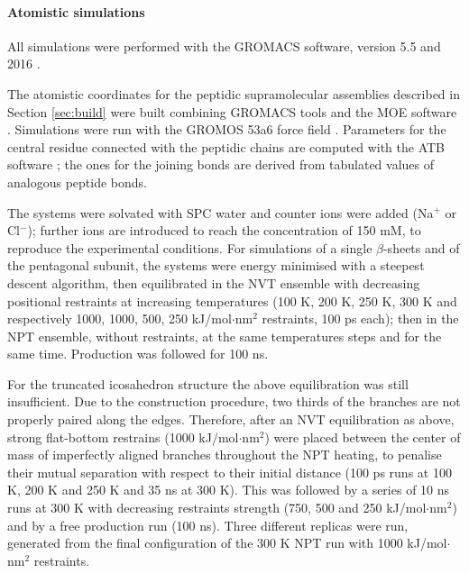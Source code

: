 \paragraph{Atomistic simulations}
All simulations were performed with the GROMACS software, version 5.5 and 2016 \cite{Berendsen1995,Abraham2015,gromacs_man}. 

The atomistic coordinates for the peptidic supramolecular assemblies described in Section \ref{sec:build} were built combining GROMACS tools and the MOE software \cite{moe}.
%
Simulations were run with the GROMOS 53a6 force field \cite{Oostenbrink2004}. Parameters for the central residue connected with the peptidic chains are computed with the ATB software \cite{Malde2011, Koziara2014}; the ones for the joining bonds are derived from tabulated values of analogous peptide bonds. 

The systems were solvated with SPC water \cite{Berendsen1981} and counter ions were added (Na$^+$ or Cl$^-$); further ions are introduced to reach the concentration of 150 mM, to reproduce the experimental conditions.
%
For simulations of a single $\beta$-sheets and of the pentagonal subunit, the systems were energy minimised with a steepest descent algorithm, then equilibrated in the NVT ensemble with decreasing positional restraints at increasing temperatures (100 K, 200 K, 250 K, 300 K and respectively 1000, 1000, 500, 250 kJ/mol$\cdot$nm$^2$ restraints, 100 ps each); then in the NPT ensemble, without restraints, at the same temperatures steps and for the same time. Production was followed for 100 ns.

For the truncated icosahedron structure the above equilibration was still insufficient. Due to the construction procedure, two thirds of the branches are not properly paired along the edges.
%
Therefore, after an NVT equilibration as above, strong flat-bottom restrains (1000 kJ/mol$\cdot$nm$^2$) were placed between the center of mass of imperfectly aligned branches throughout the NPT heating, to penalise their mutual separation with respect to their initial distance (100 ps runs at 100 K, 200 K and 250 K and 35 ns at 300 K).
%
This was followed by a series of 10 ns runs at 300 K with decreasing restraints strength (750, 500 and 250 kJ/mol$\cdot$nm$^2$) and by a free production run (100 ns).
%
Three different replicas were run, generated from the final configuration of the 300 K NPT run with 1000 kJ/mol$\cdot$nm$^2$ restraints.

